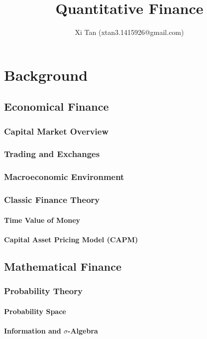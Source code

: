 \documentclass{book}
\title{Quantitative Finance}
\author{Xi Tan (xtan3.1415926@gmail.com)}
\begin{document}
\maketitle
\tableofcontents


\part{Background}
\chapter{Economical Finance}
\section{Capital Market Overview}
\section{Trading and Exchanges}
\section{Macroeconomic Environment}
\section{Classic Finance Theory}
\subsection{Time Value of Money}
\subsection{Capital Asset Pricing Model (CAPM)}


\chapter{Mathematical Finance}
\section{Probability Theory}
\subsection{Probability Space}
\subsection{Information and $\sigma$-Algebra}
\end{document}
